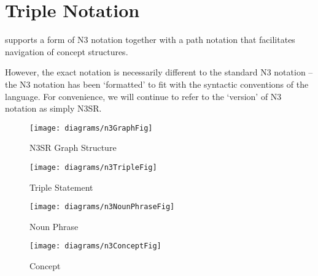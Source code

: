 \section{\Sr Triple Notation}
\label{n3Notation}
\Sr supports a form of N3 notation together with a path notation that facilitates navigation of concept structures.

However, the exact notation is necessarily different to the standard N3 notation -- the \Sr N3 notation has been `formatted' to fit with the syntactic conventions of the \Sr language. For convenience, we will continue to refer to the \Sr `version' of N3 notation as simply N3SR. 

\begin{figure}[htbp]
   \texttt{[image: diagrams/n3GraphFig]}
   \caption{N3SR Graph Structure}
   \label{n3GraphFig}
\end{figure}

\begin{figure}[htbp]
   \texttt{[image: diagrams/n3TripleFig]}
   \caption{Triple Statement}
   \label{n3TripleFig}
\end{figure}

\begin{figure}[htbp]
   \texttt{[image: diagrams/n3NounPhraseFig]}
   \caption{Noun Phrase}
   \label{n3NounPhraseFig}
\end{figure}

\begin{figure}[htbp]
   \texttt{[image: diagrams/n3ConceptFig]}
   \caption{Concept}
   \label{n3ConceptFig}
\end{figure}



